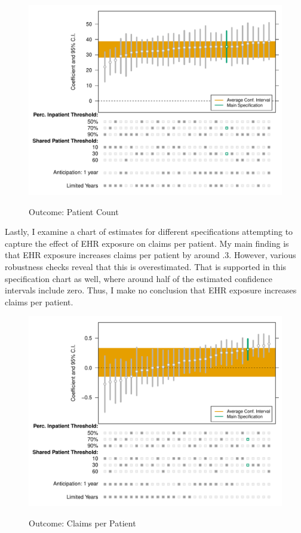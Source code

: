 \documentclass[12pt]{article}
\begin{document}
\begin{figure}[ht]
    \caption{Outcome: Patient Count}
    \includegraphics[scale=.7]{Objects/patient_chart.pdf}
    \label{fig:pat_chart}
\end{figure}

Lastly, I examine a chart of estimates for different specifications attempting to capture the effect of EHR exposure on claims per patient. My main finding is that EHR exposure increases claims per patient by around .3. However, various robustness checks reveal that this is overestimated. That is supported in this specification chart as well, where around half of the estimated confidence intervals include zero. Thus, I make no conclusion that EHR exposure increases claims per patient. 

\begin{figure}[ht]
    \caption{Outcome: Claims per Patient}
    \includegraphics[scale=.7]{Objects/claim_chart.pdf}
    \label{fig:cpp_chart}
\end{figure}
\end{document}
